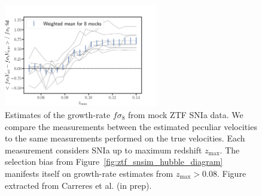 \begin{figure}
    \centering
    \includegraphics[width=0.6\textwidth]{fig/velocities/bastien_fs8_bias.pdf}
    \caption{Estimates of the growth-rate $f\sigma_8$ from mock ZTF SNIa data. 
    We compare the measurements between the estimated peculiar velocities to the 
    same measurements performed on the true velocities. 
    Each measurement considers SNIa up to maximum redshift $z_\text{max}$.
    The selection bias from Figure~\ref{fig:ztf_snsim_hubble_diagram} manifests itself
    on growth-rate estimates from $z_\text{max}>0.08$. 
    Figure extracted from Carreres et al. (in prep).}
    \label{fig:ztf_snsim_fs8_bias}
\end{figure}

